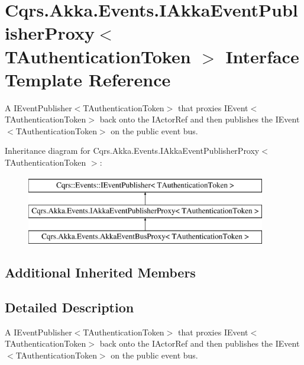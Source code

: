 \hypertarget{interfaceCqrs_1_1Akka_1_1Events_1_1IAkkaEventPublisherProxy}{}\section{Cqrs.\+Akka.\+Events.\+I\+Akka\+Event\+Publisher\+Proxy$<$ T\+Authentication\+Token $>$ Interface Template Reference}
\label{interfaceCqrs_1_1Akka_1_1Events_1_1IAkkaEventPublisherProxy}


A I\+Event\+Publisher$<$\+T\+Authentication\+Token$>$ that proxies I\+Event$<$\+T\+Authentication\+Token$>$ back onto the I\+Actor\+Ref and then publishes the I\+Event$<$\+T\+Authentication\+Token$>$ on the public event bus.  


Inheritance diagram for Cqrs.\+Akka.\+Events.\+I\+Akka\+Event\+Publisher\+Proxy$<$ T\+Authentication\+Token $>$\+:\begin{figure}[H]
\begin{center}
\leavevmode
\includegraphics[height=3.000000cm]{interfaceCqrs_1_1Akka_1_1Events_1_1IAkkaEventPublisherProxy}
\end{center}
\end{figure}
\subsection*{Additional Inherited Members}


\subsection{Detailed Description}
A I\+Event\+Publisher$<$\+T\+Authentication\+Token$>$ that proxies I\+Event$<$\+T\+Authentication\+Token$>$ back onto the I\+Actor\+Ref and then publishes the I\+Event$<$\+T\+Authentication\+Token$>$ on the public event bus. 

